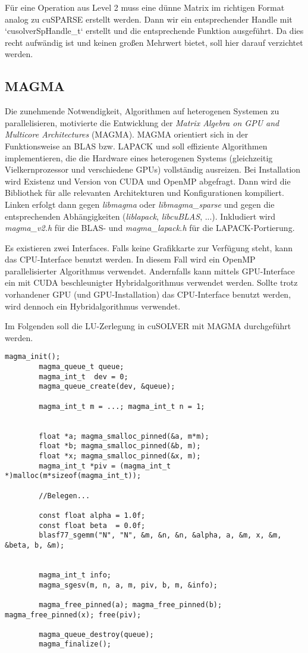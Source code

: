 		Für eine Operation aus Level 2 muss eine dünne Matrix im richtigen Format analog zu cuSPARSE erstellt werden. Dann wir ein entsprechender \Gls{Handle} mit \li`cusolverSpHandle_t` erstellt und die entsprechende Funktion ausgeführt. Da dies recht aufwändig ist und keinen großen Mehrwert bietet, soll hier darauf verzichtet werden.
		
		\subsection{MAGMA}
		Die zunehmende Notwendigkeit, Algorithmen auf heterogenen Systemen zu parallelisieren, motivierte die Entwicklung der \textit{Matrix Algebra on GPU and Multicore Architectures} (MAGMA). MAGMA orientiert sich in der Funktionsweise an BLAS bzw. LAPACK und soll effiziente Algorithmen implementieren, die die Hardware eines heterogenen Systems (gleichzeitig Vielkernprozessor und verschiedene GPUs) vollständig ausreizen. Bei Installation wird Existenz und Version von CUDA und OpenMP abgefragt. Dann wird die Bibliothek für alle relevanten Architekturen und Konfigurationen kompiliert. Linken erfolgt dann gegen \textit{libmagma} oder \textit{libmagma{\_}sparse} und gegen die entsprechenden Abhängigkeiten (\textit{liblapack}, \textit{libcuBLAS}, ...). Inkludiert wird \textit{magma{\_}v2.h} für die BLAS- und \textit{magma{\_}lapack.h} für die LAPACK-Portierung.

		Es existieren zwei Interfaces. Falls keine Grafikkarte zur Verfügung steht, kann das CPU-Interface benutzt werden. In diesem Fall wird ein OpenMP parallelisierter Algorithmus verwendet. Andernfalls kann mittels GPU-Interface ein mit CUDA beschleunigter Hybridalgorithmus verwendet werden. Sollte trotz vorhandener GPU (und GPU-Installation) das CPU-Interface benutzt werden, wird dennoch ein Hybridalgorithmus verwendet.
		
		Im Folgenden soll die LU-Zerlegung in cuSOLVER mit MAGMA durchgeführt werden.
		
		\begin{lstlisting}[caption=MAGMA: CPU-Interface]
		magma_init();
		magma_queue_t queue;
		magma_int_t  dev = 0;
		magma_queue_create(dev, &queue);
  
		magma_int_t m = ...; magma_int_t n = 1;
                      
                      
		float *a; magma_smalloc_pinned(&a, m*m);   
		float *b; magma_smalloc_pinned(&b, m);  
		float *x; magma_smalloc_pinned(&x, m);   
		magma_int_t *piv = (magma_int_t *)malloc(m*sizeof(magma_int_t));
		
		//Belegen...

		const float alpha = 1.0f;
		const float beta  = 0.0f;
		blasf77_sgemm("N", "N", &m, &n, &n, &alpha, a, &m, x, &m, &beta, b, &m);


		magma_int_t info;
		magma_sgesv(m, n, a, m, piv, b, m, &info);

		magma_free_pinned(a); magma_free_pinned(b); magma_free_pinned(x); free(piv);

		magma_queue_destroy(queue);
		magma_finalize();
		\end{lstlisting}
		
